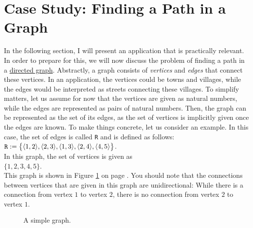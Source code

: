 \section{Case Study: Finding a Path in a Graph}
In the following section, I will present an application that is practically relevant.  In order to prepare for this,
we will now discuss the problem of finding a path in a
\href{https://en.wikipedia.org/wiki/Directed_graph}{directed graph}. 
Abstractly, a graph consists of \emph{vertices} and \emph{edges} that connect these vertices.  In an application, the
vertices could be towns and villages, while the edges would be interpreted as streets connecting these
villages.  To simplify matters, let us assume for now that the vertices are given as natural numbers, while the
edges are represented as pairs of natural numbers.  Then, the graph can be represented as the set of its edges,
as the set of vertices is implicitly given once the edges are known.  To make things concrete, let us consider
an example.  In this case, the set of edges is called \texttt{R} and is defined as follows: 
\\[0.2cm]
\hspace*{1.3cm}
$\texttt{R}\; \mathtt{:=}\; \bigl\{ \pair(1,2), \pair(2,3), \pair(1,3), \pair(2,4), \pair(4,5) \bigr\}$.
\\[0.2cm]
In this graph, the set of vertices is given as
\\[0.2cm]
\hspace*{1.3cm}
$\{ 1, 2, 3, 4, 5 \}$.
\\[0.2cm]
This graph is shown in Figure \ref{fig:graph0} on page \pageref{fig:graph0}.  You should note that the
connections between vertices that are given in this graph are unidirectional:  While there is a connection from
vertex $1$ to vertex $2$, there is no connection from vertex $2$ to vertex $1$.

 
\begin{figure}[!ht]
  \centering

  \caption{A simple graph.}
  \label{fig:graph0}
\end{figure}



